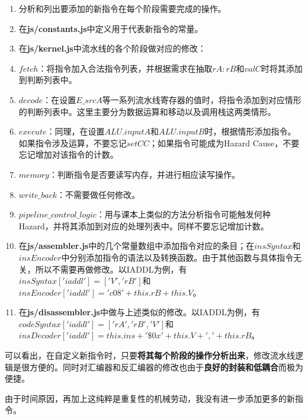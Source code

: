 \begin{enumerate}
\item 分析和列出要添加的新指令在每个阶段需要完成的操作。
\item 在{\bf js/constants.js}中定义用于代表新指令的常量。
\item 在{\bf js/kernel.js}中流水线的各个阶段做对应的修改：
\item $fetch$：将指令加入合法指令列表，并根据需求在抽取$rA:rB$和$valC$时将其添加到判断列表中。
\item $decode$：在设置$E\_srcA$等一系列流水线寄存器的值时，将指令添加到对应情形的判断列表中。这里主要分为数据运算和移动以及调用栈这两类情形。
\item $execute$：同理，在设置$ALU.inputA$和$ALU.inputB$时，根据情形添加指令。如果指令涉及运算，不要忘记$setCC$；如果指令可能成为Hazard Cause，不要忘记增加对该指令的计数。
\item $memory$：判断指令是否要读写内存，并进行相应读写操作。
\item $write\_back$：不需要做任何修改。
\item $pipeline\_control\_logic$：用与课本上类似的方法分析指令可能触发何种Hazard，并将其添加到对应的处理列表中。同样不要忘记增加计数。
\item 在{\bf js/assembler.js}中的几个常量数组中添加指令对应的条目；在$insSyntax$和$insEncoder$中分别添加指令的语法以及转换函数。由于其他函数与具体指令无关，所以不需要再做修改。以IADDL为例，有$insSyntax['iaddl'] = ['V', 'rB']$和$insEncoder['iaddl'] = 'c08' + this.rB + this.V$。
\item 在{\bf js/disassembler.js}中做与上述类似的修改。以IADDL为例，有$codeSyntax['iaddl'] = ['rA', 'rB', 'V']$和$insDecoder['iaddl'] = this.ins + ' \$0x' + this.V + ', ' + this.rB$。
\end{enumerate}

可以看出，在自定义新指令时，只要{\bf 将其每个阶段的操作分析出来}，修改流水线逻辑是很方便的。同时对汇编器和反汇编器的修改也由于{\bf 良好的封装和低耦合}而极为便捷。

由于时间原因，再加上这纯粹是重复性的机械劳动，我没有进一步添加更多的新指令。